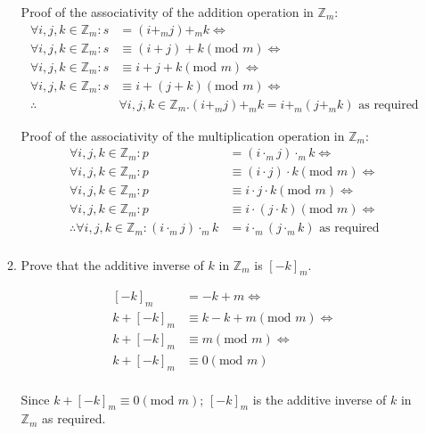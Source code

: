 \documentclass[10pt,\jkfside,a4paper]{article}
\begin{document}
\begin{enumerate}
\begin{enumerate}
Proof of the associativity of the addition operation in $\mathbb{Z}_m$:
\begin{equation}
\begin{split}
\forall i, j, k \in \mathbb{Z}_m: s &= (i+_mj)+_mk\Longleftrightarrow\\
\forall i, j, k \in \mathbb{Z}_m: s &\equiv (i + j) + k (\text{mod } m)\Longleftrightarrow\\
\forall i, j, k \in \mathbb{Z}_m: s &\equiv i + j + k (\text{mod } m)\Longleftrightarrow\\
\forall i, j, k \in \mathbb{Z}_m: s &\equiv i + (j + k) (\text{mod } m) \Longleftrightarrow\\
\therefore &\forall i, j, k \in \mathbb{Z}_m. (i+_mj)+_mk=i+_m(j+_mk)\text{ as required}
\end{split}
\end{equation}

Proof of the associativity of the multiplication operation in $\mathbb{Z}_m$:
\begin{equation}
\begin{split}
\forall i, j, k \in \mathbb{Z}_m: p &= (i\cdot_mj)\cdot_mk\Longleftrightarrow\\
\forall i, j, k \in \mathbb{Z}_m: p &\equiv (i\cdot j)\cdot k (\text{mod } m)\Longleftrightarrow\\
\forall i, j, k \in \mathbb{Z}_m: p &\equiv i\cdot j \cdot k (\text{mod } m)\Longleftrightarrow\\
\forall i, j, k \in \mathbb{Z}_m: p &\equiv i\cdot (j \cdot k) (\text{mod } m)\Longleftrightarrow\\
\therefore \forall i, j, k \in \mathbb{Z}_m:(i\cdot_mj)\cdot_mk &= i\cdot_m(j\cdot_mk)\text{ as required}\\
\end{split}
\end{equation}

\item Prove that the additive inverse of $k$ in $\mathbb{Z}_m$ is $[-k]_m$.

\begin{equation}
\begin{split}
[-k]_m &= -k + m\Longleftrightarrow\\
k + [-k]_m &\equiv k - k + m (\text{mod } m)\Longleftrightarrow\\
k + [-k]_m &\equiv m (\text{mod } m)\Longleftrightarrow\\
k + [-k]_m &\equiv 0 (\text{mod } m)\\
\end{split}
\end{equation}

Since $k + [-k]_m \equiv 0 (\text{mod } m)$; $[-k]_m$ is the additive inverse of $k$ in $\mathbb{Z}_m$ as required.

\end{enumerate}

\end{enumerate}
\end{document}
